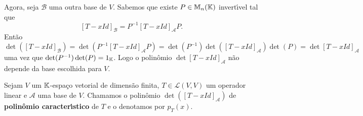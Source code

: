 Agora, seja $\mathcal{B}$ uma outra base de $V$. Sabemos que existe $P \in \mathbb{M}_n(\mathbb{K})$ invert{\'\i}vel tal que
\[
[T - xId]_\mathcal{B} = P^{-1}[T - xId]_\mathcal{A}P.
\]
Ent\~ao
\[
	\det([T - xId]_\mathcal{B}) = \det(P^{-1}[T - xId]_\mathcal{A}P) = \det(P^{-1})\det([T - xId]_\mathcal{A})\det(P) = \det[T - xId]_\mathcal{A}
\]
uma vez que $\det(P^{-1})\det(P) = 1_{\mathbb{K}}$. Logo o polin\^omio $\det[T - xId]_\mathcal{A}$ n\~ao depende da base escolhida para $V$.

\begin{definicao}
	Sejam $V$ um $\mathbb{K}$-espa\c{c}o vetorial de dimens\~ao finita, $T \in \mathcal{L}(V,V)$ um operador linear e $\mathcal{A}$ uma base de $V$. Chamamos o polin\^omio $\det([T - xId]_\mathcal{A})$ de \textbf{polin\^omio caracter{\'\i}stico} de $T$ e o denotamos por $p_T(x)$.
\end{definicao}

